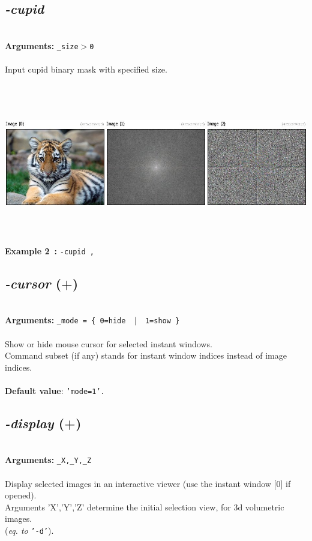 \documentclass[a4paper,11pt,twoside]{book}
\begin{document}
\subsection{\emph{-cupid} }\vspace*{-0.5em}
~\\\textbf{Arguments: } 
{\small \texttt{\_size$>$0}}\\~\\
Input cupid binary mask with specified size.
\begin{center}\includegraphics[keepaspectratio=true,height=7cm,width=\textwidth]{img/gmic_def2.jpg}\\
{\footnotesize \textbf{Example 2~:} \texttt{-cupid ,}}
\end{center}

\subsection{\emph{-cursor} (+)}\vspace*{-0.5em}
~\\\textbf{Arguments: } 
{\small \texttt{\_mode = \{ 0=hide ~$|$~ 1=show \}}}\\~\\
Show or hide mouse cursor for selected instant windows.
~\\Command subset (if any) stands for instant window indices instead of image indices.
~\\~\\\textbf{Default value}: {\small \texttt{'mode=1'.}}


\subsection{\emph{-display} (+)}\vspace*{-0.5em}
~\\\textbf{Arguments: } 
{\small \texttt{\_X,\_Y,\_Z}}\\~\\
Display selected images in an interactive viewer (use the instant window [0] if opened).
~\\Arguments 'X','Y','Z' determine the initial selection view, for 3d volumetric images.
~\\(\emph{eq. to} {\small \texttt{'-d'}}).
\end{document}
